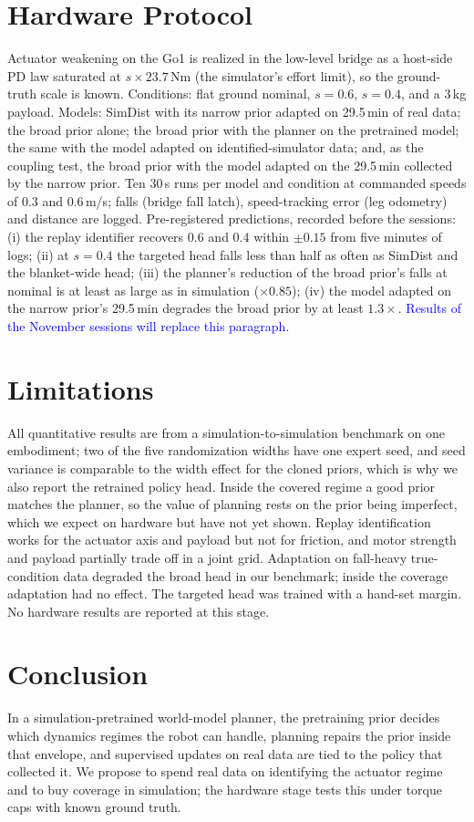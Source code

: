 \documentclass[conference]{IEEEtran}
\newcommand{\prelim}[1]{\textcolor{blue}{#1}}
\begin{document}
\section{Hardware Protocol}
Actuator weakening on the Go1 is realized in the low-level bridge as a host-side PD law saturated at $s\times23.7$\,Nm (the simulator's effort limit), so the ground-truth scale is known. Conditions: flat ground nominal, $s=0.6$, $s=0.4$, and a 3\,kg payload. Models: SimDist with its narrow prior adapted on 29.5\,min of real data; the broad prior alone; the broad prior with the planner on the pretrained model; the same with the model adapted on identified-simulator data; and, as the coupling test, the broad prior with the model adapted on the 29.5\,min collected by the narrow prior. Ten 30\,s runs per model and condition at commanded speeds of 0.3 and 0.6\,m/s; falls (bridge fall latch), speed-tracking error (leg odometry) and distance are logged. Pre-registered predictions, recorded before the sessions: (i) the replay identifier recovers $0.6$ and $0.4$ within $\pm0.15$ from five minutes of logs; (ii) at $s=0.4$ the targeted head falls less than half as often as SimDist and the blanket-wide head; (iii) the planner's reduction of the broad prior's falls at nominal is at least as large as in simulation ($\times0.85$); (iv) the model adapted on the narrow prior's 29.5\,min degrades the broad prior by at least $1.3\times$. \prelim{Results of the November sessions will replace this paragraph.}

\section{Limitations}
All quantitative results are from a simulation-to-simulation benchmark on one embodiment; two of the five randomization widths have one expert seed, and seed variance is comparable to the width effect for the cloned priors, which is why we also report the retrained policy head. Inside the covered regime a good prior matches the planner, so the value of planning rests on the prior being imperfect, which we expect on hardware but have not yet shown. Replay identification works for the actuator axis and payload but not for friction, and motor strength and payload partially trade off in a joint grid. Adaptation on fall-heavy true-condition data degraded the broad head in our benchmark; inside the coverage adaptation had no effect. The targeted head was trained with a hand-set margin. No hardware results are reported at this stage.

\section{Conclusion}
In a simulation-pretrained world-model planner, the pretraining prior decides which dynamics regimes the robot can handle, planning repairs the prior inside that envelope, and supervised updates on real data are tied to the policy that collected it. We propose to spend real data on identifying the actuator regime and to buy coverage in simulation; the hardware stage tests this under torque caps with known ground truth.



\end{document}

